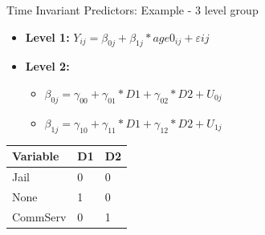\begin{frame}{Time Invariant Predictors: Example - 3 level group}

\begin{itemize}
  \item \textbf{Level 1:} $Y_{ij} = \beta_{0j} + \beta_{1j}*age0_{ij} + \varepsilon{ij}$
  \item \textbf{Level 2:} 
    \begin{itemize} 
      \item $\beta_{0j} = \gamma_{00} + \gamma_{01}*D1 + \gamma_{02}*D2 + U_{0j}$
      \item $\beta_{1j} = \gamma_{10} + \gamma_{11}*D1 + \gamma_{12}*D2 + U_{1j}$
    \end{itemize}
\end{itemize}

\begin{longtable}[]{@{}lll@{}}
\toprule
Variable & D1 & D2\tabularnewline
\midrule
\endhead
Jail & 0 & 0\tabularnewline
None & 1 & 0\tabularnewline
CommServ & 0 & 1\tabularnewline
\bottomrule
\end{longtable}

\end{frame}

